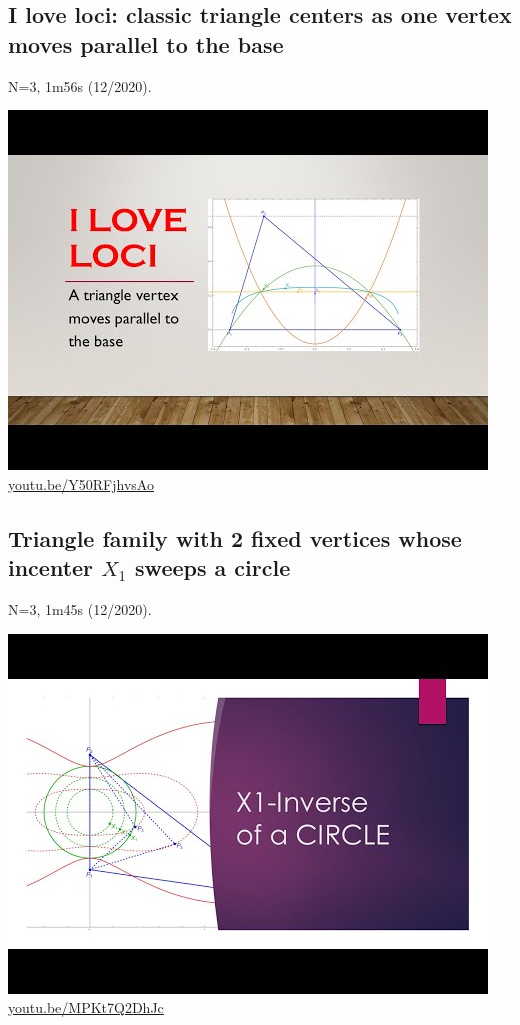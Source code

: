 \documentclass[12pt]{amsart}
\begin{document}
\subsection{I love loci: classic triangle centers as one vertex moves parallel to the base}
\label{vid:Y50RFjhvsAo}
\noindent N=3, 1m56s (12/2020). 
\begin{center}\includegraphics[width=.5\textwidth]{pics/Y50RFjhvsAo.jpg} \\ 
\href{https://youtu.be/Y50RFjhvsAo}{\url{youtu.be/Y50RFjhvsAo}}\end{center}
% 

\subsection{Triangle family with 2 fixed vertices whose incenter $X_{1}$ sweeps a circle}
\label{vid:MPKt7Q2DhJc}
\noindent N=3, 1m45s (12/2020). 
\begin{center}\includegraphics[width=.5\textwidth]{pics/MPKt7Q2DhJc.jpg} \\ 
\href{https://youtu.be/MPKt7Q2DhJc}{\url{youtu.be/MPKt7Q2DhJc}}\end{center}
% 
\end{document}
